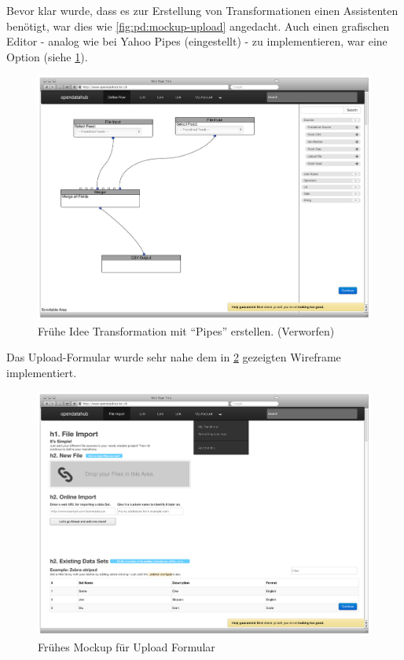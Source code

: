 Bevor klar wurde, dass es zur Erstellung von Transformationen einen Assistenten benötigt, war dies wie \cref{fig:pd:mockup-upload} angedacht. Auch einen grafischen Editor - analog wie bei Yahoo Pipes (eingestellt) - zu implementieren, war eine Option (siehe \cref{fig:pd:connectors}).

\begin{figure}[H]
    \centering
    \includegraphics[width=0.8\linewidth]{fig/Wireframes-Connectors}
    \caption{Frühe Idee Transformation mit ``Pipes'' erstellen. (Verworfen)}
    \label{fig:pd:connectors}
\end{figure}

Das Upload-Formular wurde sehr nahe dem in \cref{fig:pd:wireframe-upload} gezeigten Wireframe implementiert.

\begin{figure}[H]
    \centering
    \includegraphics[width=0.8\linewidth]{fig/Wireframes-Upload}
    \caption{Frühes Mockup für Upload Formular}
    \label{fig:pd:wireframe-upload}
\end{figure}

